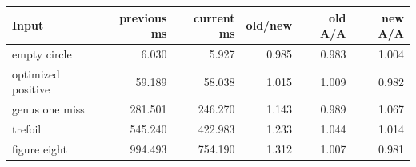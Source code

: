 \begin{center}
\small
\begin{tabular}{lrrrrr}
\toprule
Input & previous ms & current ms & old/new & old A/A & new A/A\\
\midrule
empty circle & 6.030 & 5.927 & 0.985 & 0.983 & 1.004\\
optimized positive & 59.189 & 58.038 & 1.015 & 1.009 & 0.982\\
genus one miss & 281.501 & 246.270 & 1.143 & 0.989 & 1.067\\
trefoil & 545.240 & 422.983 & 1.233 & 1.044 & 1.014\\
figure eight & 994.493 & 754.190 & 1.312 & 1.007 & 0.981\\
\bottomrule
\end{tabular}
\end{center}
